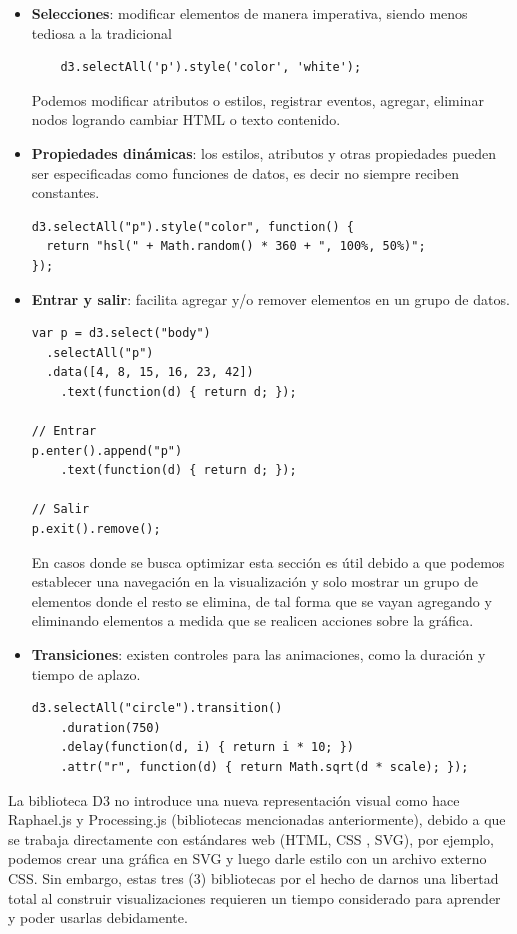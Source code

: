\begin{itemize}
\item\textbf{Selecciones}: modificar elementos de manera imperativa, siendo menos tediosa a la tradicional
\begin{verbatim}
    d3.selectAll('p').style('color', 'white');
\end{verbatim}
Podemos modificar atributos o estilos, registrar eventos, agregar, eliminar nodos logrando cambiar HTML o texto contenido.

\item\textbf{Propiedades dinámicas}: los estilos, atributos y otras propiedades pueden ser especificadas como funciones de datos, es decir no siempre reciben constantes.
\begin{verbatim}
d3.selectAll("p").style("color", function() {
  return "hsl(" + Math.random() * 360 + ", 100%, 50%)";
});
\end{verbatim}

\item\textbf{Entrar y salir}: facilita agregar y/o remover elementos en un grupo de datos.
\begin{verbatim}
var p = d3.select("body")
  .selectAll("p")
  .data([4, 8, 15, 16, 23, 42])
    .text(function(d) { return d; });

// Entrar
p.enter().append("p")
    .text(function(d) { return d; });

// Salir
p.exit().remove();
\end{verbatim}
En casos donde se busca optimizar esta sección es útil debido a que podemos establecer una navegación en la visualización y solo mostrar un grupo de elementos donde el resto se elimina, de tal forma que se vayan agregando y eliminando elementos a medida que se realicen acciones sobre la gráfica. 

\item\textbf{Transiciones}: existen controles para las animaciones, como la duración y tiempo de aplazo.
\begin{verbatim}
d3.selectAll("circle").transition()
    .duration(750)
    .delay(function(d, i) { return i * 10; })
    .attr("r", function(d) { return Math.sqrt(d * scale); });
\end{verbatim}
\end{itemize}
La biblioteca D3 no introduce una nueva representación visual como hace Raphael.js y Processing.js (bibliotecas mencionadas anteriormente), debido a que se trabaja directamente con estándares web (HTML, CSS \cite{MozCSS}, SVG), por ejemplo, podemos crear una gráfica en SVG y luego darle estilo con un archivo externo CSS. Sin embargo, estas tres (3) bibliotecas por el hecho de darnos una libertad total al construir visualizaciones requieren un tiempo considerado para aprender y poder usarlas debidamente.

